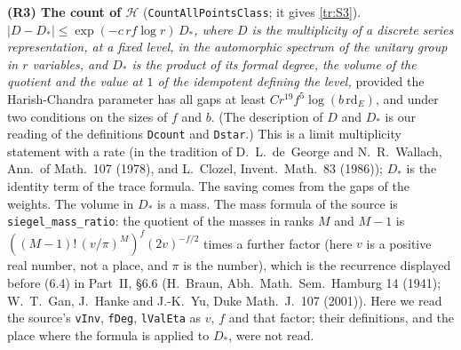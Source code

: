 \documentclass[11pt,letterpaper]{article}
\begin{document}
\textbf{(R3) The count of $\mathcal H$} (\texttt{CountAllPointsClass}; it gives \eqref{tr:S3}).
\emph{$|D-D_*|\le\exp(-c\,rf\log r)\,D_*$, where $D$ is the multiplicity of a discrete series representation,
at a fixed level, in the automorphic spectrum of the unitary group in $r$ variables, and $D_*$ is the product
of its formal degree, the volume of the quotient and the value at $1$ of the idempotent defining the level,}
provided the Harish-Chandra parameter has all gaps at least $Cr^{19}f^5\log(b\,\mathrm{rd}_E)$, and under two
conditions on the sizes of $f$ and $b$. (The description of $D$ and $D_*$ is our reading of the definitions
\texttt{Dcount} and \texttt{Dstar}.) This is a limit
multiplicity statement with a rate (in the tradition of D.~L.~de~George and N.~R.~Wallach, Ann.\ of Math.\ 107
(1978), and L.~Clozel, Invent.\ Math.\ 83 (1986)); $D_*$ is the identity term of the trace formula. The saving
comes from the gaps of the weights. The volume in $D_*$ is a mass. The mass formula of the source is
\texttt{siegel\_mass\_ratio}: the quotient of the masses in ranks $M$ and $M-1$ is
$((M-1)!\,(v/\pi)^M)^f(2v)^{-f/2}$ times a further factor (here $v$ is a positive real number, not a
place, and $\pi$ is the number), which is the recurrence displayed before (6.4) in
Part~II, \S6.6 (H.~Braun, Abh.\ Math.\ Sem.\ Hamburg 14 (1941); W.~T.~Gan, J.~Hanke and J.-K.~Yu, Duke Math.\ J.\
107 (2001)). Here we read the source's \texttt{vInv}, \texttt{fDeg}, \texttt{lValEta} as $v$, $f$ and that factor;
their definitions, and the place where the formula is applied to $D_*$, were not read.
\end{document}
